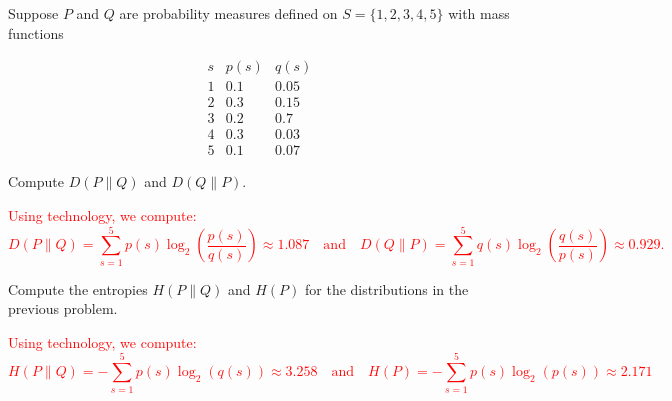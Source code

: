 \documentclass[12pt,reqno]{amsart}
\begin{document}
\bigskip

\prob Suppose $P$ and $Q$ are probability measures defined on $S = \{1,2,3,4,5\}$ with mass functions

	\[
	\begin{array}{c|cc}
	s & p(s) & q(s) \\ \hline
	1 & 0.1 & 0.05 \\
	2 & 0.3 & 0.15 \\
	3 & 0.2 & 0.7 \\
	4 & 0.3 & 0.03 \\
	5 & 0.1 & 0.07
	\end{array}
	\]

Compute $D( P \parallel Q)$ and $D(Q\parallel P)$.

\bigskip
\textcolor{red}{Using technology, we compute:
	\[D( P \parallel Q) = \sum_{s=1}^5 p(s) \log_2 \left( \frac{p(s)}{q(s)} \right) \approx 1.087 \quad \text{and} \quad D( Q \parallel P) = \sum_{s=1}^5 q(s) \log_2 \left( \frac{q(s)}{p(s)} \right) \approx 0.929.
	\]}
\bigskip







\prob Compute the entropies $H(P \parallel Q)$ and $H(P)$ for the distributions in the previous problem.

\bigskip
\textcolor{red}{Using technology, we compute:
	\[H(P \parallel Q) = -\sum_{s=1}^5 p(s) \log_2(q(s)) \approx 3.258 \quad \text{and} \quad H(P) = - \sum_{s=1}^5 p(s) \log_2(p(s)) \approx 2.171
	\]}
\bigskip
\end{document}
